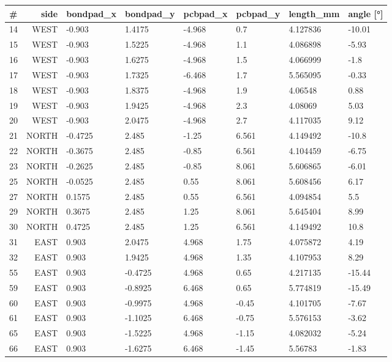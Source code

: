 \documentclass{cernatsnote}
\begin{document}
\begin{figure}
\begin{longtable}{l r l l l l l l}
\toprule
\#  & side & bondpad\_x & bondpad\_y  & pcbpad\_x & pcbpad\_y & length\_mm  & angle  [°] \\

\midrule
14 & WEST & -0.903 & 1.4175 & -4.968 & 0.7 & 4.127836 & -10.01 \\
15 & WEST & -0.903 & 1.5225 & -4.968 & 1.1 & 4.086898 & -5.93 \\
16 & WEST & -0.903 & 1.6275 & -4.968 & 1.5 & 4.066999 & -1.8 \\
17 & WEST & -0.903 & 1.7325 & -6.468 & 1.7 & 5.565095 & -0.33 \\
18 & WEST & -0.903 & 1.8375 & -4.968 & 1.9 & 4.06548 & 0.88 \\
19 & WEST & -0.903 & 1.9425 & -4.968 & 2.3 & 4.08069 & 5.03 \\
20 & WEST & -0.903 & 2.0475 & -4.968 & 2.7 & 4.117035 & 9.12 \\
21 & NORTH & -0.4725 & 2.485 & -1.25 & 6.561 & 4.149492 & -10.8 \\
22 & NORTH & -0.3675 & 2.485 & -0.85 & 6.561 & 4.104459 & -6.75 \\
23 & NORTH & -0.2625 & 2.485 & -0.85 & 8.061 & 5.606865 & -6.01 \\
25 & NORTH & -0.0525 & 2.485 & 0.55 & 8.061 & 5.608456 & 6.17 \\
27 & NORTH & 0.1575 & 2.485 & 0.55 & 6.561 & 4.094854 & 5.5 \\
29 & NORTH & 0.3675 & 2.485 & 1.25 & 8.061 & 5.645404 & 8.99 \\
30 & NORTH & 0.4725 & 2.485 & 1.25 & 6.561 & 4.149492 & 10.8 \\
31 & EAST & 0.903 & 2.0475 & 4.968 & 1.75 & 4.075872 & 4.19 \\
32 & EAST & 0.903 & 1.9425 & 4.968 & 1.35 & 4.107953 & 8.29 \\
55 & EAST & 0.903 & -0.4725 & 4.968 & 0.65 & 4.217135 & -15.44 \\
59 & EAST & 0.903 & -0.8925 & 6.468 & 0.65 & 5.774819 & -15.49 \\
60 & EAST & 0.903 & -0.9975 & 4.968 & -0.45 & 4.101705 & -7.67 \\
61 & EAST & 0.903 & -1.1025 & 6.468 & -0.75 & 5.576153 & -3.62 \\
65 & EAST & 0.903 & -1.5225 & 4.968 & -1.15 & 4.082032 & -5.24 \\
66 & EAST & 0.903 & -1.6275 & 6.468 & -1.45 & 5.56783 & -1.83 \\

\end{longtable}
\end{figure}
\end{document}
